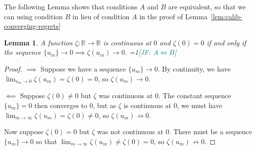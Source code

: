 \documentclass[11pt]{article} %
\newcommand{\Comments}{1}
\newcommand{\mynote}[2]{\ifnum\Comments=1\textcolor{#1}{#2}\fi}
\newcommand{\jessie}[1]{\mynote{teal}{[JF: #1]}}
\newcommand{\reals}{\mathbb{R}}
\newtheorem{lemma}{Lemma}
\begin{document}
The following Lemma shows that conditions $A$ and $B$ are equivalent, so that we can using condition $B$ in lieu of condition $A$ in the proof of Lemma~\ref{lem:calib-converging-regrets}
\begin{lemma}\label{lem:continuous-iff-limits}
	A function $\zeta:\reals \to \reals$ is continuous at $0$ and $\zeta(0) = 0$ if and only if the sequence $\{u_m\} \to 0 \implies \zeta(u_m) \to 0$.
	\jessie{$A \iff B$}
\end{lemma}
\begin{proof}
	$\implies$ Suppose we have a sequence $\{u_m\} \to 0$.
	By continuity, we have $\lim_{u_m \to 0}\zeta(u_m) = \zeta(0) = 0$, so $\zeta(u_m) \to 0$.
	
	$\impliedby$ Suppose $\zeta(0) \neq 0$ but $\zeta$ was continuous at $0$.
	The constant sequence $\{u_m\} = 0$ then converges to $0$, but as $\zeta$ is continuous at $0$, we must have $\lim_{m \to \infty}\zeta(u_m) = \zeta(0) \neq 0$, so $\zeta(u_m) \not \to 0$.
	
	Now suppose $\zeta(0) = 0$ but $\zeta$ was not continuous at $0$.
	There must be a sequence $\{u_m\} \to 0$ so that $\lim_{m \to \infty}\zeta(u_m) \neq \zeta(0) = 0$, so $\zeta(u_m) \not \to 0$.
\end{proof}
\end{document}
